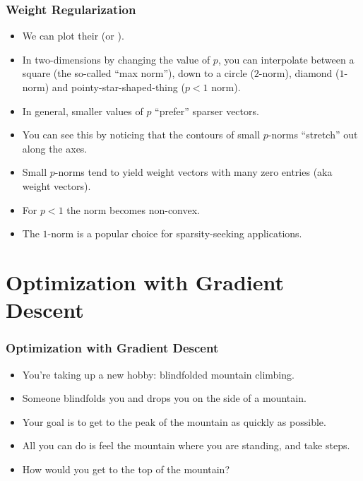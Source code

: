 \documentclass[trans,aspectratio=169]{beamer}
\begin{document}
\begin{frame}
  \frametitle{Weight Regularization}
\begin{itemize}
\item
We can plot their 
(or ).
\item In two-dimensions by changing the value of $p$, you can interpolate between a
square (the so-called ``max norm''), down to a circle ($2$-norm),
diamond ($1$-norm) and pointy-star-shaped-thing ($p<1$ norm).
\item
In general, smaller values of $p$ ``prefer'' sparser vectors.  
\item You can
see this by noticing that the contours of small $p$-norms ``stretch''
out along the axes.
\item Small $p$-norms tend
to yield weight vectors with many zero entries (aka 
weight vectors). 
\item For $p<1$ the norm becomes
non-convex.  
\item The $1$-norm is a
popular choice for sparsity-seeking applications.

\end{itemize}
\end{frame}
\section{Optimization with Gradient Descent}

\begin{frame}
  \frametitle{Optimization with Gradient Descent}
\begin{itemize}
\item
You're taking up a new hobby:
blindfolded mountain climbing.  
\item Someone blindfolds you and drops you
on the side of a mountain.  
\item Your goal is to get to the peak of the
mountain as quickly as possible. 
\item  All you can do is feel the mountain
where you are standing, and take steps. 
\item  How would you get to the top
of the mountain?  
\end{itemize}
\end{frame}
\end{document}
